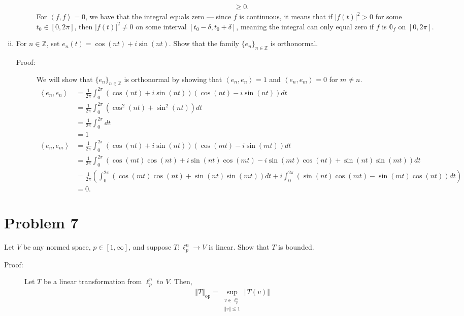 \documentclass[8pt]{extarticle}
\newcommand{\Z}{\mathbb{Z}}
\newcommand{\iprod}[2]{\left\langle #1,#2\right\rangle}
\newcommand{\norm}[1]{\left\Vert #1\right\Vert}
\begin{document}
\begin{enumerate}[(i)]
\begin{description}
\begin{align*}
                         &\geq 0.
          \end{align*}
          For $\iprod{f}{f} = 0$, we have that the integral equals zero --- since $f$ is continuous, it means that if $|f(t)|^2 > 0$ for some $t_0\in [0,2\pi]$, then $|f(t)|^2 \neq 0$ on some interval $[t_0-\delta,t_0+\delta]$, meaning the integral can only equal zero if $f$ is $\mathbb{0}_f$ on $[0,2\pi]$.
      \end{description}
    \item For $n\in\Z$, set $e_n(t) = \cos(nt) + i\sin(nt)$. Show that the family $\{e_n\}_{n\in\Z}$ is orthonormal.
      \begin{description}
        \item[Proof:] We will show that $\{e_n\}_{n\in\Z}$ is orthonormal by showing that $\iprod{e_n}{e_n} = 1$ and $\iprod{e_n}{e_m} = 0$ for $m\neq n$.
          \begin{align*}
            \iprod{e_n}{e_n} &= \frac{1}{2\pi}\int_{0}^{2\pi}(\cos(nt) + i\sin(nt))(\cos(nt)-i\sin(nt))dt\\
                             &= \frac{1}{2\pi}\int_{0}^{2\pi}\left(\cos^{2}(nt) + \sin^{2}(nt)\right)dt\\
                             &= \frac{1}{2\pi}\int_{0}^{2\pi}dt\\
                             &= 1\\
            \iprod{e_n}{e_m} &= \frac{1}{2\pi}\int_{0}^{2\pi}(\cos(nt) + i\sin(nt))(\cos(mt) - i\sin(mt))dt\\
                             &= \frac{1}{2\pi}\int_{0}^{2\pi}\left(\cos(mt)\cos(nt) + i\sin(nt)\cos(mt) - i\sin(mt)\cos(nt) + \sin(nt)\sin(mt)\right)dt\\
                             &= \frac{1}{2\pi}\left(\int_{0}^{2\pi}(\cos(mt)\cos(nt) + \sin(nt)\sin(mt))dt + i\int_{0}^{2\pi}(\sin(nt)\cos(mt) - \sin(mt)\cos(nt))dt\right)\\
                             &= 0.
          \end{align*}
      \end{description}
  \end{enumerate}
  \section{Problem 7}%
  Let $V$ be any normed space, $p\in[1,\infty]$, and suppose $T:\ell_{p}^{n}\rightarrow V$ is linear. Show that $T$ is bounded.
  \begin{description}
    \item[Proof:] Let $T$ be a linear transformation from $\ell_{p}^{n}$ to $V$. Then,
      \begin{align*}
        \norm{T}_{\text{op}} = \sup_{\substack{v\in \ell_{p}^{n}\\\norm{v}\leq 1}}\norm{T(v)}
      \end{align*}
  \end{description}
\end{document}
